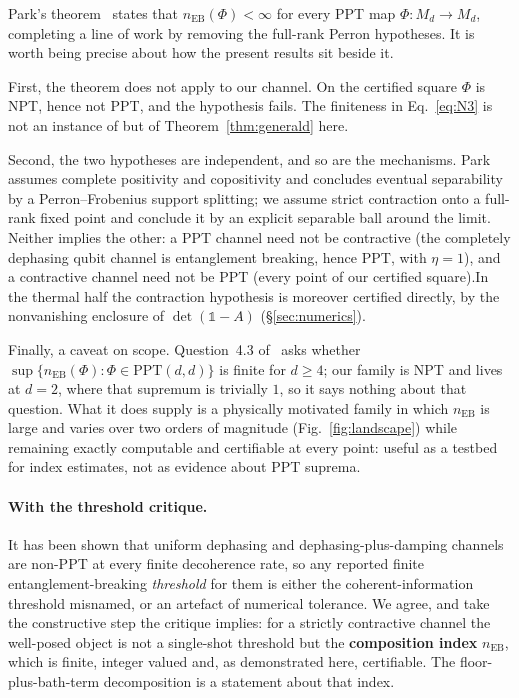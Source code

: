 \documentclass[11pt,a4paper]{article}
\theoremstyle{definition}
\theoremstyle{remark}
\newcommand{\I}{\mathbb{1}}
\newcommand{\nEB}{n_{\mathrm{EB}}}
\newcommand{\PPT}{\mathrm{PPT}}
\begin{document}
Park's theorem~\cite[Thm.~1.1]{Park2026} states that $\nEB(\Phi)<\infty$ for
every PPT map $\Phi:M_{d}\to M_{d}$, completing a line of work
\cite{RJP2018,HRF2020} by removing the full-rank Perron hypotheses. It is worth
being precise about how the present results sit beside it.

First, the theorem does not apply to our channel. On the certified square
$\Phi$ is NPT, hence not PPT, and the hypothesis fails. The finiteness in
Eq.~\eqref{eq:N3} is not an instance of \cite[Thm.~1.1]{Park2026} but of
Theorem~\ref{thm:generald} here.

Second, the two hypotheses are independent, and so are the mechanisms. Park
assumes complete positivity and copositivity and concludes eventual
separability by a
Perron--Frobenius support splitting; we assume strict contraction onto a
full-rank fixed point and conclude it by an explicit separable ball around the
limit. Neither implies the other: a PPT channel need not be contractive (the
completely dephasing qubit channel is entanglement breaking, hence PPT, with
$\eta=1$), and a contractive channel need not be PPT (every point of our
certified square).In the thermal half the
contraction hypothesis is moreover certified directly, by the nonvanishing
enclosure of $\det(\I-A)$ (\S\ref{sec:numerics}).

Finally, a caveat on scope. Question~4.3 of~\cite{Park2026} asks whether
$\sup\{\nEB(\Phi):\Phi\in\PPT(d,d)\}$ is finite for $d\ge4$; our family is NPT
and lives at $d=2$, where that supremum is trivially $1$, so it says nothing
about that question. What it does supply is a physically motivated family in
which $\nEB$ is large and varies over two orders of magnitude
(Fig.~\ref{fig:landscape}) while remaining exactly computable and certifiable
at every point: useful as a testbed for index estimates, not as evidence about
PPT suprema.

\paragraph{With the threshold critique.} It has been shown \cite{NoThreshold} that uniform dephasing and dephasing-plus-damping channels are non-PPT at every finite decoherence rate, so any reported finite entanglement-breaking \emph{threshold} for them is either the coherent-information threshold misnamed, or an artefact of numerical tolerance. We agree, and take the constructive step the critique implies: for a strictly contractive channel the well-posed object is not a single-shot threshold but the \textbf{composition index} $\nEB$, which is finite, integer valued and, as demonstrated here, certifiable. The floor-plus-bath-term decomposition is a statement about that index.
\end{document}
